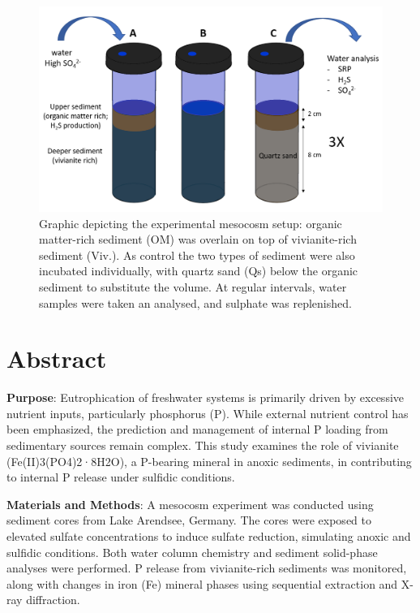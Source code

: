 \documentclass[12pt,twoside]{book}
\begin{document}
\begin{figure}

{\centering \includegraphics[width=0.7\linewidth]{figure/Setup_HS_Incubation_description} 

}

\caption{Graphic depicting the experimental mesocosm setup: organic matter-rich sediment (OM) was overlain on top of vivianite-rich sediment (Viv.). As control the two types of sediment were also incubated individually, with quartz sand (Qs) below the organic sediment to substitute the volume. At regular intervals, water samples were taken an analysed, and sulphate was replenished.}\label{fig:IncubationSetup}
\end{figure}

\section*{Abstract}\label{abstract}

\noindent \textbf{Purpose}: Eutrophication of freshwater systems is primarily driven by excessive nutrient inputs, particularly phosphorus (P). While external nutrient control has been emphasized, the prediction and management of internal P loading from sedimentary sources remain complex. This study examines the role of vivianite (Fe(II)3(PO4)2·8H2O), a P-bearing mineral in anoxic sediments, in contributing to internal P release under sulfidic conditions.

\noindent \textbf{Materials and Methods}: A mesocosm experiment was conducted using sediment cores from Lake Arendsee, Germany. The cores were exposed to elevated sulfate concentrations to induce sulfate reduction, simulating anoxic and sulfidic conditions. Both water column chemistry and sediment solid-phase analyses were performed. P release from vivianite-rich sediments was monitored, along with changes in iron (Fe) mineral phases using sequential extraction and X-ray diffraction.
\end{document}
